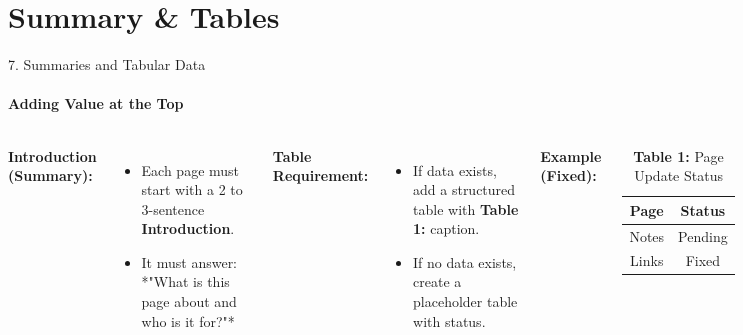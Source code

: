 \documentclass[10pt, aspectratio=169]{beamer}
\begin{document}
	\section{Summary \& Tables}
	\begin{frame}{7. Summaries and Tabular Data}
		\framesubtitle{Adding Value at the Top}
		\begin{columns}[T]
			\textbf{Introduction (Summary):}
			\begin{itemize}
				\item Each page must start with a 2 to 3-sentence \textbf{Introduction}.
				\item It must answer: *"What is this page about and who is it for?"*
			\end{itemize}
			\pause
			\textbf{Table Requirement:}
			\begin{itemize}
				\item If data exists, add a structured table with \textbf{Table 1:} caption.
				\item If no data exists, create a placeholder table with status.
			\end{itemize}
			\pause
			\textbf{Example (Fixed):}
			\begin{table}[]
				\centering
				\caption{\textbf{Table 1:} Page Update Status}
				\begin{tabular}{|c|c|}
					\hline
					\textbf{Page} & \textbf{Status} \\
					\hline
					Notes & Pending \\
					Links & Fixed \\
					\hline
				\end{tabular}
			\end{table}
		\end{columns}
	\end{frame}
	
\end{document}
